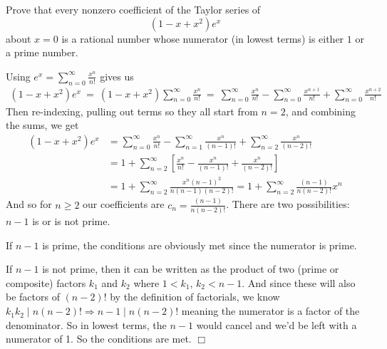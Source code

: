



\parindent 0pt
\marginparsep 3pt




\sloppy
\thispagestyle{firstpageheader}



\begin{problem}[D][7][Putnam 2014 /A1]
Prove that every nonzero coefficient of the Taylor series of 
\[
(1 - x + x^2)e^x
\]
about $x = 0$ is a rational number whose numerator (in lowest terms) is either $1$ or a prime number.
\end{problem}

\begin{solution}
    Using $\displaystyle e^x=\sum_{n=0}^\infty \frac{x^n}{n!}$ gives us
    \begin{align*}
        (1 - x + x^2)e^x \ = \ (1 - x + x^2)\sum_{n=0}^\infty \frac{x^n}{n!} \ = \ \sum_{n=0}^\infty \frac{x^n}{n!} - \sum_{n=0}^\infty \frac{x^{n+1}}{n!} + \sum_{n=0}^\infty\frac{x^{n+2}}{n!}
    \end{align*}
    Then re-indexing, pulling out terms so they all start from $n=2$, and combining the sums, we get
    \begin{align*}
        (1 - x + x^2)e^x &= \sum_{n=0}^\infty \frac{x^n}{n!} - \sum_{n=1}^\infty \frac{x^{n}}{(n-1)!} + \sum_{n=2}^\infty\frac{x^{n}}{(n-2)!}\\
        &= 1 + \sum_{n=2}^\infty \left[\frac{x^n}{n!} - \frac{x^{n}}{(n-1)!} + \frac{x^{n}}{(n-2)!}\right]\\
        &= 1 + \sum_{n=2}^\infty \frac{x^n(n-1)^2}{n(n-1)(n-2)!} = 1 + \sum_{n=2}^\infty \frac{(n-1)}{n(n-2)!}x^n
    \end{align*}
    And so for $n \geq 2$ our coefficients are $c_n=\frac{(n-1)}{n(n-2)!}$. There are two possibilities: $n-1$ is or is not prime.
    
    If $n-1$ is prime, the conditions are obviously met since the numerator is prime.
    
    If $n-1$ is not prime, then it can be written as the product of two (prime or composite) factors $k_1$ and $k_2$ where $1 < k_1,\, k_2 < n-1$. And since these will also be factors of $(n-2)!$ by the definition of factorials, we know $k_1k_2 \mid n(n-2)! \Rightarrow n-1 \mid n(n-2)!$ meaning the numerator is a factor of the denominator. So in lowest terms, the $n-1$ would cancel and we'd be left with a numerator of 1. So the conditions are met. $\Box$
\end{solution}

